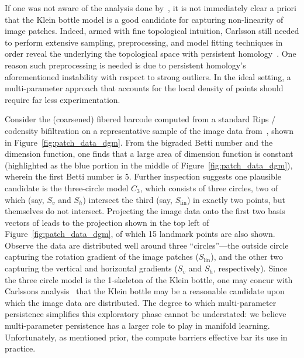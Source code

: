 \documentclass[sn-mathphys]{sn-jnl}
\begin{document}
If one was not aware of the analysis done by~\cite{lee2003nonlinear, hateren_schaaf_1998, carlsson2008local, perea2014klein}, it is not immediately clear a priori that the Klein bottle model is  a good candidate for capturing non-linearity of image patches. 
Indeed, armed with fine topological intuition, Carlsson still needed to perform extensive sampling, preprocessing, and model fitting techniques in order reveal the underlying the topological space with persistent homology~\cite{carlsson2008local}.
One reason such preprocessing is needed is due to persistent homology's aforementioned instability with respect to strong outliers. 
In the ideal setting, a multi-parameter approach that accounts for the local density of points should require far less experimentation. 
 
Consider the (coarsened) fibered barcode computed from a standard Rips / codensity bifiltration on a representative sample of the image data from~\cite{hateren_schaaf_1998}, shown in Figure~\ref{fig:patch_data_dgm}. 
From the bigraded Betti number and the dimension function, one finds that a large area of dimension function is constant (highlighted as the blue portion in the middle of Figure~\ref{fig:patch_data_dgm}), wherein the first Betti number is 5. Further inspection suggests one plausible candidate is the three-circle model $C_3$, which consists of three circles, two of which (say, $S_v$ and $S_h$) intersect the third (say, $S_\mathrm{lin}$) in exactly two points, but themselves do not intersect. 
Projecting the image data onto the first two basis vectors of leads to the projection shown in the top left of Figure~\ref{fig:patch_data_dgm}, of which 15 landmark points are also shown. Observe the data are distributed well around three ``circles''---the outside circle capturing the rotation gradient of the image patches ($S_{\mathrm{lin}}$), and the other two capturing the vertical and horizontal gradients ($S_v$ and $S_h$, respectively). Since the three circle model is the 1-skeleton of the Klein bottle, one may concur with Carlssons analysis~\cite{carlsson2008local} that the Klein bottle may be a reasonable candidate upon which the image data are distributed. 
The degree to which multi-parameter persistence simplifies this exploratory phase cannot be understated: we believe multi-parameter persistence has a larger role to play in manifold learning. 
Unfortunately, as mentioned prior, the compute barriers effective bar its use in practice. 
\end{document}
